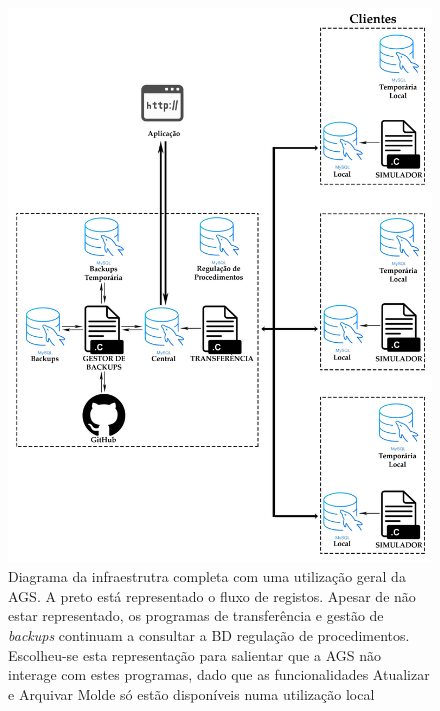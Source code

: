 \documentclass[11pt,twoside,a4paper]{report}
\begin{document}
\begin{figure}[H]
	\begin{center}
		\includegraphics[width=1\textwidth]{Esquema_Projeto_Total02} %
		\caption[Diagrama da infraestrutra completa com uma utilização geral da aplicação de gestão do sistema]{Diagrama da infraestrutra completa com uma utilização geral da AGS. A preto está representado o fluxo de registos. Apesar de não estar representado, os programas de transferência e gestão de \textit{backups} continuam a consultar a BD regulação de procedimentos. Escolheu-se esta representação para salientar que a AGS não interage com estes programas, dado que as funcionalidades Atualizar e Arquivar Molde só estão disponíveis numa utilização local}
		\label{fig:infra_total2}
	\end{center}
\end{figure}
\end{document}
